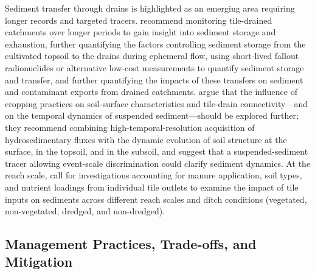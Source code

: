 Sediment transfer through drains is highlighted as an emerging area requiring longer records and targeted tracers. \textcite{Grangeon2021} recommend monitoring tile-drained catchments over longer periods to gain insight into sediment storage and exhaustion, further quantifying the factors controlling sediment storage from the cultivated topsoil to the drains during ephemeral flow, using short-lived fallout radionuclides or alternative low-cost measurements to quantify sediment storage and transfer, and further quantifying the impacts of these transfers on sediment and contaminant exports from drained catchments. \textcite{Gaillot2023b} argue that the influence of cropping practices on soil-surface characteristics and tile-drain connectivity---and on the temporal dynamics of suspended sediment---should be explored further; they recommend combining high-temporal-resolution acquisition of hydrosedimentary fluxes with the dynamic evolution of soil structure at the surface, in the topsoil, and in the subsoil, and suggest that a suspended-sediment tracer allowing event-scale discrimination could clarify sediment dynamics. At the reach scale, \textcite{Ahiablame2010} call for investigations accounting for manure application, soil types, and nutrient loadings from individual tile outlets to examine the impact of tile inputs on sediments across different reach scales and ditch conditions (vegetated, non-vegetated, dredged, and non-dredged).

\subsection{Management Practices, Trade-offs, and Mitigation}

